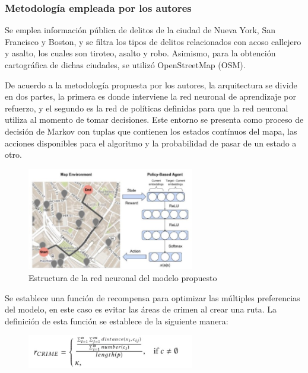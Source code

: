 \subsubsection{Metodología empleada por los autores}
Se emplea información pública de delitos de la ciudad de Nueva York, San Francisco y Boston, y se filtra los tipos de delitos relacionados con acoso callejero y asalto, los cuales son tiroteo, asalto y robo. Asimismo, para la obtención cartográfica de dichas ciudades, se utilizó OpenStreetMap (OSM).

De acuerdo a la metodología propuesta por los autores, la arquitectura se divide en dos partes, la primera es donde interviene la red neuronal de aprendizaje por refuerzo, y el segundo es la red de políticas definidas para que la red neuronal utiliza al momento de tomar decisiones. Este entorno se presenta como proceso de decisión de Markov con tuplas que contienen los estados contínuos del mapa, las acciones disponibles para el algoritmo y la probabilidad de pasar de un estado a otro.

\begin{figure}[h]
	\begin{center}
		\includegraphics[width=0.65\textwidth]{2/figures/safeRouteAgent.jpg}
		\caption{Estructura de la red neuronal del modelo propuesto}
		\label{1:fig2}
	\end{center}
\end{figure}

Se establece una función de recompensa para optimizar las múltiples preferencias del modelo, en este caso es evitar las áreas de crimen al crear una ruta. La definición de esta función se establece de la siguiente manera:
\begin{figure}[h]
	\begin{center}
		\includegraphics[width=0.65\textwidth]{2/figures/EcuacSafe.jpg}
	\end{center}
\end{figure}

